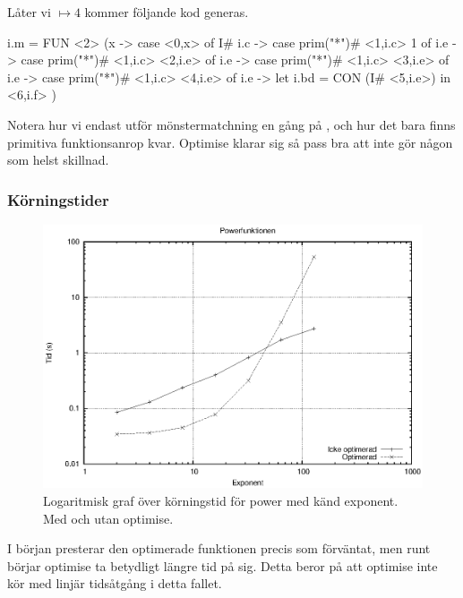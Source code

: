 \documentclass[Rapport]{subfiles}
\begin{document}
Låter vi  $\mapsto 4$ kommer följande kod generas.

\begin{codeEx}
  i.m = FUN <2> (x -> case <0,x> of
    { I# i.c -> case prim("*")# <1,i.c> 1 of
       { {i.e} -> case prim("*")# <1,i.c> <2,i.e> of
          { {i.e} -> case prim("*")# <1,i.c> <3,i.e> of
             { {i.e} -> case prim("*")# <1,i.c> <4,i.e> of
                { {i.e} -> let
                   { i.bd = CON (I# <5,i.e>)
                   } in <6,i.f>
                }
             }
          }
       }
    })
\end{codeEx}

Notera hur vi endast utför mönstermatchning en gång på , och hur det bara finns 
primitiva funktionsanrop kvar. Optimise klarar sig så pass bra att  inte 
gör någon som helst skillnad.


\subsubsection{Körningstider}


\begin{figure}[H]
\includegraphics{power.eps}
\caption{Logaritmisk graf över körningstid för power med känd exponent.
Med och utan optimise.}
\label{fig:Resultat:shapes:graf}
\end{figure}

I början presterar den optimerade funktionen precis som förväntat, men runt 
börjar optimise ta betydligt längre tid på sig. Detta beror på att optimise inte kör med linjär tidsåtgång i detta fallet. 
\end{document}
